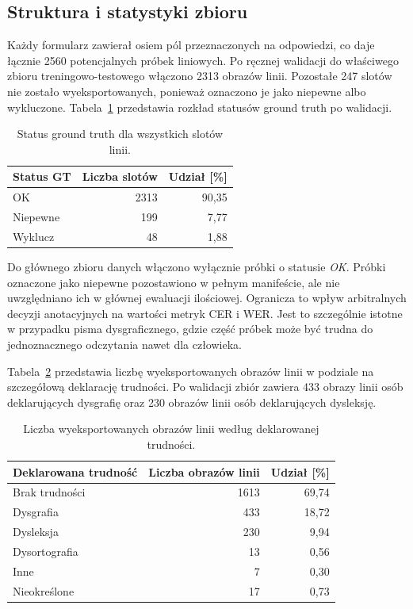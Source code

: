 \subsection{Struktura i statystyki zbioru}
\label{subsec:struktura-i-statystyki-zbioru}

Każdy formularz zawierał osiem pól przeznaczonych na odpowiedzi, co daje łącznie 2560
potencjalnych próbek liniowych. Po ręcznej walidacji do właściwego zbioru treningowo-testowego
włączono 2313 obrazów linii. Pozostałe 247 slotów nie zostało wyeksportowanych, ponieważ
oznaczono je jako niepewne albo wykluczone. Tabela~\ref{tab:dataset-status-gt} przedstawia
rozkład statusów ground truth po walidacji.

\begin{table}[htbp]
    \centering
    \caption{Status ground truth dla wszystkich slotów linii.}
    \label{tab:dataset-status-gt}
    \begin{tabular}{lrr}
        \hline
        Status GT & Liczba slotów & Udział [\%] \\
        \hline
        OK & 2313 & 90{,}35 \\
        Niepewne & 199 & 7{,}77 \\
        Wyklucz & 48 & 1{,}88 \\
        \hline
    \end{tabular}
\end{table}

Do głównego zbioru danych włączono wyłącznie próbki o statusie \textit{OK}. Próbki oznaczone
jako niepewne pozostawiono w pełnym manifeście, ale nie uwzględniano ich w głównej ewaluacji
ilościowej. Ogranicza to wpływ arbitralnych decyzji anotacyjnych na wartości metryk CER i WER.
Jest to szczególnie istotne w przypadku pisma dysgraficznego, gdzie część próbek może być
trudna do jednoznacznego odczytania nawet dla człowieka.

Tabela~\ref{tab:dataset-obrazy-trudnosci} przedstawia liczbę wyeksportowanych obrazów linii
w podziale na szczegółową deklarację trudności. Po walidacji zbiór zawiera 433 obrazy linii
osób deklarujących dysgrafię oraz 230 obrazów linii osób deklarujących dysleksję.

\begin{table}[htbp]
    \centering
    \caption{Liczba wyeksportowanych obrazów linii według deklarowanej trudności.}
    \label{tab:dataset-obrazy-trudnosci}
    \begin{tabular}{lrr}
        \hline
        Deklarowana trudność & Liczba obrazów linii & Udział [\%] \\
        \hline
        Brak trudności & 1613 & 69{,}74 \\
        Dysgrafia & 433 & 18{,}72 \\
        Dysleksja & 230 & 9{,}94 \\
        Dysortografia & 13 & 0{,}56 \\
        Inne & 7 & 0{,}30 \\
        Nieokreślone & 17 & 0{,}73 \\
        \hline
    \end{tabular}
\end{table}

